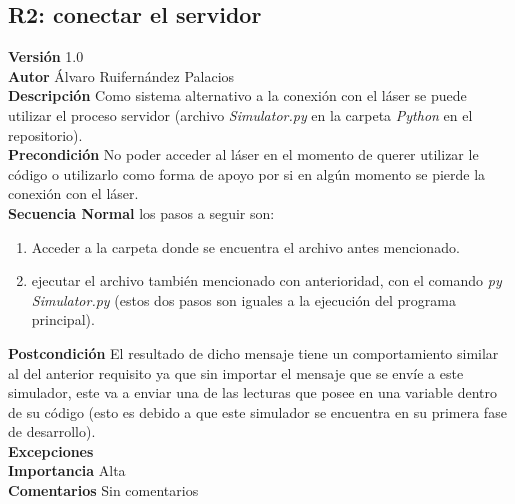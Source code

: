 \subsection{R2: conectar el servidor}
\textbf{Versión} 1.0\\
\textbf{Autor} Álvaro Ruifernández Palacios\\
\textbf{Descripción} Como sistema alternativo a la conexión con el láser se puede utilizar el proceso servidor (archivo \textit{Simulator.py} en la carpeta \textit{Python} en el repositorio).  \\
\textbf{Precondición} No poder acceder al láser en el momento de querer utilizar le código o utilizarlo como forma de apoyo por si en algún momento se pierde la conexión con el láser.\\
\textbf{Secuencia Normal} los pasos a seguir son:
\begin{enumerate}
	\item Acceder a la carpeta donde se encuentra el archivo antes mencionado.
	\item ejecutar el archivo también mencionado con anterioridad, con el comando \textit{py Simulator.py} (estos dos pasos son iguales a la ejecución del programa principal).
\end{enumerate}
\textbf{Postcondición} El resultado de dicho mensaje tiene un comportamiento similar al del anterior requisito ya que sin importar el mensaje que se envíe a este simulador, este va a enviar una de las lecturas que posee en una variable dentro de su código (esto es debido a que este simulador se encuentra en su primera fase de desarrollo).\\
\textbf{Excepciones}\\
\textbf{Importancia} Alta\\
\textbf{Comentarios} Sin comentarios\\

